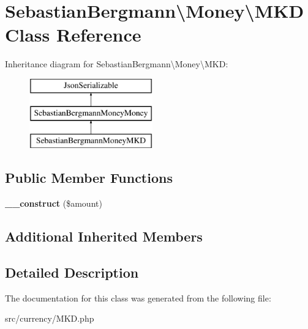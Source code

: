 \hypertarget{classSebastianBergmann_1_1Money_1_1MKD}{}\section{Sebastian\+Bergmann\textbackslash{}Money\textbackslash{}M\+K\+D Class Reference}
\label{classSebastianBergmann_1_1Money_1_1MKD}
Inheritance diagram for Sebastian\+Bergmann\textbackslash{}Money\textbackslash{}M\+K\+D\+:\begin{figure}[H]
\begin{center}
\leavevmode
\includegraphics[height=3.000000cm]{classSebastianBergmann_1_1Money_1_1MKD}
\end{center}
\end{figure}
\subsection*{Public Member Functions}
\begin{DoxyCompactItemize}
\item 
\hypertarget{classSebastianBergmann_1_1Money_1_1MKD_a12096a0d949792f27e620f062976003a}{}{\bfseries \+\_\+\+\_\+construct} (\$amount)\label{classSebastianBergmann_1_1Money_1_1MKD_a12096a0d949792f27e620f062976003a}

\end{DoxyCompactItemize}
\subsection*{Additional Inherited Members}


\subsection{Detailed Description}


The documentation for this class was generated from the following file\+:\begin{DoxyCompactItemize}
\item 
src/currency/M\+K\+D.\+php\end{DoxyCompactItemize}
